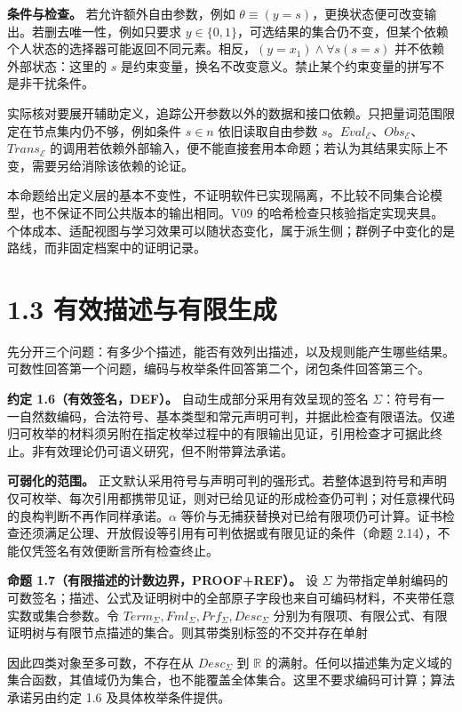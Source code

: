 \documentclass[UTF8,a4paper,zihao=-4,fontset=windows,openany]{ctexbook}
\newcommand{\mcsdisplay}[1]{%
  \par\addvspace{0.7em}%
  \sbox{\mcsmathbox}{\ensuremath{\displaystyle #1}}%
  \ifdim\wd\mcsmathbox>\linewidth
    \noindent\resizebox{\linewidth}{!}{\usebox{\mcsmathbox}}%
  \else
    \noindent\hspace*{\fill}\usebox{\mcsmathbox}\hspace*{\fill}%
  \fi
  \par\addvspace{0.7em}%
}
\def\ensuremath#1{#1}%
\def\operatorname#1{#1}%
\def\mathrm#1{#1}%
\begin{document}
\textbf{条件与检查。} 若允许额外自由参数，例如 \(\theta\equiv(y=s)\)，更换状态便可改变输出。若删去唯一性，例如只要求 \(y\in\{0,1\}\)，可选结果的集合仍不变，但某个依赖个人状态的选择器可能返回不同元素。相反，\((y=x_1)\land\forall s(s=s)\) 并不依赖外部状态：这里的 \(s\) 是约束变量，换名不改变意义。禁止某个约束变量的拼写不是非干扰条件。

实际核对要展开辅助定义，追踪公开参数以外的数据和接口依赖。只把量词范围限定在节点集内仍不够，例如条件 \(s\in n\) 依旧读取自由参数 \(s\)。\(\operatorname{Eval}_{\mathcal E}\)、\(\operatorname{Obs}_{\mathcal E}\)、\(\operatorname{Trans}_{\mathcal E}\) 的调用若依赖外部输入，便不能直接套用本命题；若认为其结果实际上不变，需要另给消除该依赖的论证。

本命题给出定义层的基本不变性，不证明软件已实现隔离，不比较不同集合论模型，也不保证不同公共版本的输出相同。V09 的哈希检查只核验指定实现夹具。个体成本、适配视图与学习效果可以随状态变化，属于派生侧；群例子中变化的是路线，而非固定档案中的证明记录。

\section{1.3 有效描述与有限生成}
先分开三个问题：有多少个描述，能否有效列出描述，以及规则能产生哪些结果。可数性回答第一个问题，编码与枚举条件回答第二个，闭包条件回答第三个。

\textbf{约定 1.6（有效签名，DEF）。} 自动生成部分采用有效呈现的签名 \(\Sigma\)：符号有一一自然数编码，合法符号、基本类型和常元声明可判，并据此检查有限语法。仅递归可枚举的材料须另附在指定枚举过程中的有限输出见证，引用检查才可据此终止。非有效理论仍可语义研究，但不附带算法承诺。

\textbf{可弱化的范围。} 正文默认采用符号与声明可判的强形式。若整体退到符号和声明仅可枚举、每次引用都携带见证，则对已给见证的形成检查仍可判；对任意裸代码的良构判断不再作同样承诺。\(\alpha\) 等价与无捕获替换对已给有限项仍可计算。证书检查还须满足公理、开放假设等引用有可判依据或有限见证的条件（命题 2.14），不能仅凭签名有效便断言所有检查终止。

\textbf{命题 1.7（有限描述的计数边界，PROOF+REF）。} 设 \(\Sigma\) 为带指定单射编码的可数签名；描述、公式及证明树中的全部原子字段也来自可编码材料，不夹带任意实数或集合参数。令 \(\mathrm{Term}_\Sigma,\mathrm{Fml}_\Sigma,\mathrm{Prf}_\Sigma,\mathrm{Desc}_\Sigma\) 分别为有限项、有限公式、有限证明树与有限节点描述的集合。则其带类别标签的不交并存在单射


\mcsdisplay{e:\ \mathrm{Term}_\Sigma\sqcup\mathrm{Fml}_\Sigma\sqcup\mathrm{Prf}_\Sigma\sqcup\mathrm{Desc}_\Sigma
\hookrightarrow\mathbb N^{<\omega},
\qquad \mathbb N^{<\omega}=\bigcup_{k<\omega}\mathbb N^k.}
\noindent 因此四类对象至多可数，不存在从 \(\mathrm{Desc}_\Sigma\) 到 \(\mathbb R\) 的满射。任何以描述集为定义域的集合函数，其值域仍为集合，也不能覆盖全体集合。这里不要求编码可计算；算法承诺另由约定 1.6 及具体枚举条件提供。
\end{document}
